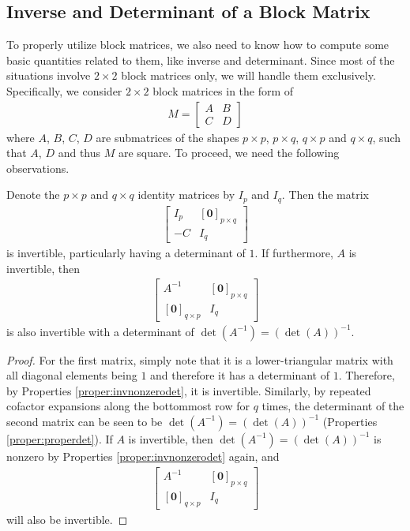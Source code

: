 \subsection{Inverse and Determinant of a Block Matrix}
To properly utilize block matrices, we also need to know how to compute some basic quantities related to them, like inverse and determinant. Since most of the situations involve $2 \times 2$ block matrices only, we will handle them exclusively. Specifically, we consider $2 \times 2$ block matrices in the form of
\begin{align*}
M = \begin{bmatrix}
A & B \\
C & D
\end{bmatrix}
\end{align*}
where $A$, $B$, $C$, $D$ are submatrices of the shapes $p \times p$, $p \times q$, $q \times p$ and $q \times q$, such that $A$, $D$ and thus $M$ are square. To proceed, we need the following observations.
\begin{proper}
\label{proper:blockmatinv}
Denote the $p \times p$ and $q \times q$ identity matrices by $I_p$ and $I_q$. Then the matrix
\begin{align*}
\begin{bmatrix}
I_p & [\textbf{0}]_{p \times q} \\
-C & I_q
\end{bmatrix}
\end{align*}
is invertible, particularly having a determinant of $1$. If furthermore, $A$ is invertible, then
\begin{align*}
\begin{bmatrix}
A^{-1} & [\textbf{0}]_{p\times q} \\
[\textbf{0}]_{q\times p} & I_q
\end{bmatrix}
\end{align*}
is also invertible with a determinant of $\det(A^{-1}) = (\det(A))^{-1}$.
\end{proper}
\begin{proof}
For the first matrix, simply note that it is a lower-triangular matrix with all diagonal elements being $1$ and therefore it has a determinant of $1$. Therefore, by Properties \ref{proper:invnonzerodet}, it is invertible. Similarly, by repeated cofactor expansions along the bottommost row for $q$ times, the determinant of the second matrix can be seen to be $\det(A^{-1}) = (\det(A))^{-1}$ (Properties \ref{proper:properdet}). If $A$ is invertible, then $\det(A^{-1}) = (\det(A))^{-1}$ is nonzero by Properties \ref{proper:invnonzerodet} again, and 
\begin{align*}
\begin{bmatrix}
A^{-1} & [\textbf{0}]_{p\times q} \\
[\textbf{0}]_{q\times p} & I_q
\end{bmatrix}    
\end{align*}
will also be invertible.
\end{proof}
